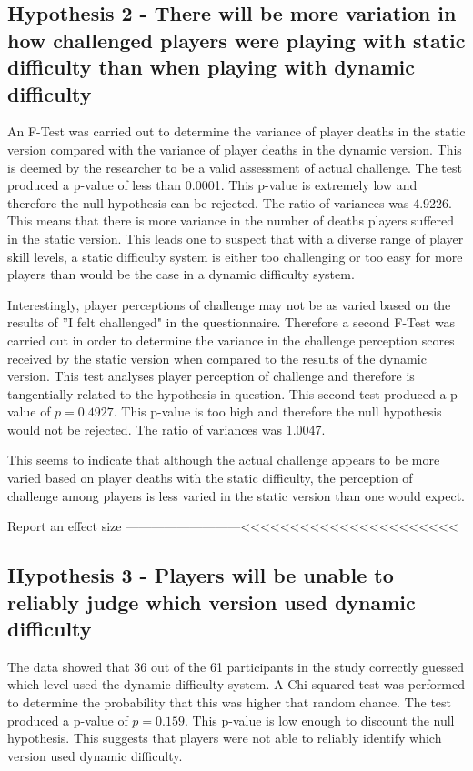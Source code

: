 \documentclass[journal]{IEEEtran}
\begin{document}
\subsection{Hypothesis 2 - There will be more variation in how challenged players were playing with static difficulty than when playing with dynamic difficulty}

An F-Test was carried out to determine the variance of player deaths in the static version compared with the variance of player deaths in the dynamic version. This is deemed by the researcher to be a valid assessment of actual challenge. The test produced a p-value of less than 0.0001. This p-value is extremely low and therefore the null hypothesis can be rejected. The ratio of variances was 4.9226. This means that there is more variance in the number of deaths players suffered in the static version. This leads one to suspect that with a diverse range of player skill levels, a static difficulty system is either too challenging or too easy for more players than would be the case in a dynamic difficulty system.

Interestingly, player perceptions of challenge may not be as varied based on the results of ''I felt challenged" in the questionnaire. Therefore a second F-Test was carried out in order to determine the variance in the challenge perception scores received by the static version when compared to the results of the dynamic version. This test analyses player perception of challenge and therefore is tangentially related to the hypothesis in question. This second test produced a p-value of $p = 0.4927$. This p-value is too high and therefore the null hypothesis would not be rejected. The ratio of variances was 1.0047.

This seems to indicate that although the actual challenge appears to be more varied based on player deaths with the static difficulty, the perception of challenge among players is less varied in the static version than one would expect.

Report an effect size ---------------------------<<<<<<<<<<<<<<<<<<<<<<

\subsection{Hypothesis 3 - Players will be unable to reliably judge which version used dynamic difficulty}

The data showed that 36 out of the 61 participants in the study correctly guessed which level used the dynamic difficulty system. A Chi-squared test was performed to determine the probability that this was higher that random chance. The test produced a p-value of $p = 0.159$. This p-value is low enough to discount the null hypothesis. This suggests that players were not able to reliably identify which version used dynamic difficulty.
\end{document}
